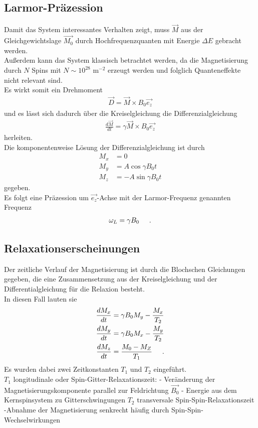 \documentclass[]{scrartcl}
\begin{document}
\subsection{Larmor-Präzession}
Damit das System interessantes Verhalten zeigt, muss $\vec{M}$ aus der Gleichgewichtslage $\vec{M_0}$ durch Hochfrequenzquanten mit Energie $\Delta E$ gebracht werden.\\
Außerdem kann das System klassisch betrachtet werden, da die Magnetisierung durch $N$ Spins mit $N \sim 10^{28}$ m$^{-2}$ erzeugt werden und folglich Quanteneffekte nicht relevant sind.\\
Es wirkt somit ein Drehmoment
\begin{align}
\vec{D}=\vec{M}\times B_0 \vec{e_z}
\end{align}
und es lässt sich dadurch über die Kreiselgleichung die Differenzialgleichung
\begin{align}
\frac{d \vec{M}}{d t} = \gamma \vec{M}\times B_0 \vec{e_z}\label{eq::magzeit}
\end{align}
herleiten.\\
Die komponentenweise Lösung der Differenzialgleichung ist durch
\begin{align}
M_x&= 0 \\
M_y&= A \cos \gamma B_0 t \\
M_z&= -A \sin \gamma B_0 t
\end{align}
gegeben.\\
Es folgt eine Präzession um $\vec{e_z}$-Achse mit der Larmor-Frequenz genannten Frequenz
\begin{align}
\omega_L =\gamma B_0 \hspace*{0.5cm}\text{.}
\end{align}
\subsection{Relaxationserscheinungen}
Der zeitliche Verlauf der Magnetisierung ist durch die Blochschen Gleichungen gegeben, die eine Zusammensetzung aus der Kreiselgleichung und der Differentialgleichung für die Relaxion besteht.\\
In diesen Fall lauten sie
\begin{align}
\frac{d M_x}{d t}&= \gamma B_0 M_y - \frac{M_x}{T_2}\\
\frac{d M_y}{d t}&= \gamma B_0 M_x - \frac{M_y}{T_2}\\
\frac{d M_z}{d t}&= \frac{M_0-M_Z}{T_1}\hspace*{0.5cm}\text{.}
\end{align}
Es wurden dabei zwei Zeitkonstanten $T_1$ und $T_2$ eingeführt.\\
$T_1$ longitudinale oder Spin-Gitter-Relaxationszeit:
- Veränderung der Magnetisierungskomponente parallel zur Feldrichtung $\vec{B_0}$ 
- Energie aus dem Kernspinsystem zu Gitterschwingungen
$T_2$ transversale Spin-Spin-Relaxationszeit
-Abnahme der Magnetisierung senkrecht häufig durch Spin-Spin-Wechselwirkungen
\end{document}
